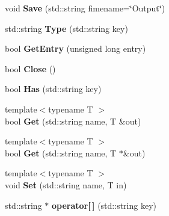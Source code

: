 \begin{DoxyCompactItemize}
\item 
\hypertarget{classBoostStore_abcdaf69c5bbbba91b3c24e69dda199ec}{void {\bfseries Save} (std\-::string fimename=\char`\"{}Output\char`\"{})}\label{classBoostStore_abcdaf69c5bbbba91b3c24e69dda199ec}

\item 
\hypertarget{classBoostStore_a50fb58e713af0920daed1be64fd7e23c}{std\-::string {\bfseries Type} (std\-::string key)}\label{classBoostStore_a50fb58e713af0920daed1be64fd7e23c}

\item 
\hypertarget{classBoostStore_ac2b2fd2169368f715d6d158140d69f0a}{bool {\bfseries Get\-Entry} (unsigned long entry)}\label{classBoostStore_ac2b2fd2169368f715d6d158140d69f0a}

\item 
\hypertarget{classBoostStore_a0532c6a62cd78cbd970b46d4212ff9e9}{bool {\bfseries Close} ()}\label{classBoostStore_a0532c6a62cd78cbd970b46d4212ff9e9}

\item 
\hypertarget{classBoostStore_af762995f2dbc5404ec1de24c34aea1ff}{bool {\bfseries Has} (std\-::string key)}\label{classBoostStore_af762995f2dbc5404ec1de24c34aea1ff}

\item 
\hypertarget{classBoostStore_aaf269e40778672ed68224377b5e90fa9}{{\footnotesize template$<$typename T $>$ }\\bool {\bfseries Get} (std\-::string name, T \&out)}\label{classBoostStore_aaf269e40778672ed68224377b5e90fa9}

\item 
\hypertarget{classBoostStore_a7e2496fd31eed43a84eea9563ecf7f86}{{\footnotesize template$<$typename T $>$ }\\bool {\bfseries Get} (std\-::string name, T $\ast$\&out)}\label{classBoostStore_a7e2496fd31eed43a84eea9563ecf7f86}

\item 
\hypertarget{classBoostStore_a94e4f0b1d996488538efc09b831cd1a6}{{\footnotesize template$<$typename T $>$ }\\void {\bfseries Set} (std\-::string name, T in)}\label{classBoostStore_a94e4f0b1d996488538efc09b831cd1a6}

\item 
\hypertarget{classBoostStore_aca2c7aed9a33e4022bb18c887d9dc42c}{std\-::string $\ast$ {\bfseries operator\mbox{[}$\,$\mbox{]}} (std\-::string key)}\label{classBoostStore_aca2c7aed9a33e4022bb18c887d9dc42c}


\end{DoxyCompactItemize}

